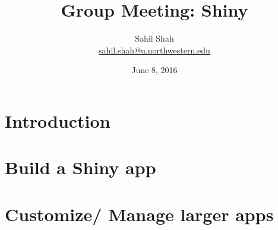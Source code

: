 \documentclass{beamer}
\title{Group Meeting: Shiny}
\author{Sahil Shah \\ 
\href{mailto:sahil.shah@u.northwestern.edu}{sahil.shah@u.northwestern.edu} \\}
\date{June 8, 2016}
\begin{document}



\frame{\titlepage}


\section{Introduction}


\section{Build a Shiny app}


\section{Customize/ Manage larger apps}


\end{document}
